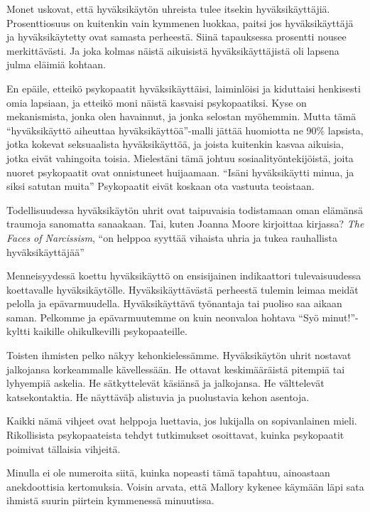 Monet uskovat, että hyväksikäytön uhreista tulee itsekin hyväksikäyttäjiä. Prosenttiosuus on kuitenkin vain kymmenen luokkaa, paitsi jos hyväksikäyttäjä ja hyväksikäytetty ovat samasta perheestä. Siinä tapauksessa prosentti nousee merkittävästi. Ja joka kolmas näistä aikuisistä hyväksikäyttäjistä oli lapsena julma eläimiä kohtaan.

En epäile, etteikö psykopaatit hyväksikäyttäisi, laiminlöisi ja kiduttaisi henkisesti omia lapsiaan, ja etteikö moni näistä kasvaisi psykopaatiksi. Kyse on mekanismista, jonka olen havainnut, ja jonka selostan myöhemmin. Mutta tämä ``hyväksikäyttö aiheuttaa hyväksikäyttöä''-malli jättää huomiotta ne 90\% lapsista, jotka kokevat seksuaalista hyväksikäyttöä, ja joista kuitenkin kasvaa aikuisia, jotka eivät vahingoita toisia. Mielestäni tämä johtuu sosiaalityöntekijöistä, joita nuoret psykopaatit ovat onnistuneet huijaamaan. ``Isäni hyväksikäytti minua, ja siksi satutan muita'' Psykopaatit eivät koskaan ota vastuuta teoistaan.

Todellisuudessa hyväksikäytön uhrit ovat taipuvaisia todistamaan oman elämänsä traumoja sanomatta sanaakaan. Tai, kuten Joanna Moore kirjoittaa kirjassa? \emph{The Faces of Narcissism}, ``on helppoa syyttää vihaista uhria ja tukea rauhallista hyväksikäyttäjää''

Menneisyydessä koettu hyväksikäyttö on ensisijainen indikaattori tulevaisuudessa koettavalle hyväksikäytölle. Hyväksikäyttävästä perheestä tulemin leimaa meidät pelolla ja epävarmuudella. Hyväksikäyttävä työnantaja tai puoliso saa aikaan saman. Pelkomme ja epävarmuutemme on kuin neonvaloa hohtava ``Syö minut!''-kyltti kaikille ohikulkevilli psykopaateille.

Toisten ihmisten pelko näkyy kehonkielessämme. Hyväksikäytön uhrit nostavat jalkojansa korkeammalle kävellessään. He ottavat keskimääräistä pitempiä tai lyhyempiä askelia. He sätkyttelevät käsiänsä ja jalkojansa. He välttelevät katsekontaktia. He näyttäväþ alistuvia ja puolustavia kehon asentoja.

Kaikki nämä vihjeet ovat helppoja luettavia, jos lukijalla on sopivanlainen mieli. Rikollisista psykopaateista tehdyt tutkimukset osoittavat, kuinka psykopaatit poimivat tällaisia vihjeitä.

Minulla ei ole numeroita siitä, kuinka nopeasti tämä tapahtuu, ainoastaan anekdoottisia kertomuksia. Voisin arvata, että Mallory kykenee käymään läpi sata ihmistä suurin piirtein kymmenessä minuutissa.

